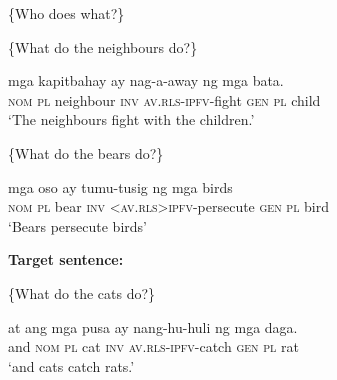 \documentclass[output=paper,
,modfonts
,nonflat]{langsci/langscibook}
\begin{document}
\newpage 
\begin{exe}
\ex\label{text5_part2a}
\begin{xlist}
 \{Who does what?\}
\end{xlist}
\begin{xlist}[{>}{>}> Q\textsubscript{{1.3}}:]
 \{What do the neighbours do?\}
\end{xlist}
\begin{xlist}[{>}>{>}> A\textsubscript{{1.3}}:]
 mga {kapitbahay{\cb}\ctopic} ay {{\ob}nag-a-away} ng mga {bata{\cb}\focus{\cb}\sq}.\\
\textsc{\void{[[}nom} \textsc{pl} neighbour \textsc{inv} \textsc{\void{[}av.rls-ipfv}-fight \textsc{gen} \textsc{pl} child\\
\glt `The neighbours fight with the children.' 
\end{xlist}
\begin{xlist}[{>}{>}> Q\textsubscript{{1.3}}:]
 \{What do the bears do?\}
\end{xlist}
\begin{xlist}[{>}>{>}> A\textsubscript{{1.3}}:]
 mga {oso{\cb}\ctopic} ay {{\ob}t{\USSmaller}um{\USGreater}u-tusig} ng mga {birds{\cb}\focus{\cb}\sq}\\
 \textsc{\void{[[}nom} \textsc{pl} bear \textsc{inv} \textsc{\void{[}<av.rls>ipfv}-persecute  \textsc{gen} \textsc{pl} bird\\
\glt `Bears persecute birds' 
\end{xlist}
\end{exe}

\begin{exe}
\ex\label{text5_part2}\textbf{Target sentence:}
\begin{xlist}
 \{What do the cats do?\}
\end{xlist}
\begin{xlist}[{>}>{>}> A\textsubscript{{1.3}}:]
\gll at {{\ob}{\ob}ang} mga {pusa{\cb}\ctopic} ay {{\ob}nang-hu-huli} ng mga {daga{\cb}\focus{\cb}}.\\
 and \textsc{\void{[[}nom} \textsc{pl} cat \textsc{inv} \textsc{\void{[}av.rls-ipfv}-catch \textsc{gen} \textsc{pl} rat\\
\glt `and cats catch rats.'
\end{xlist}
\end{exe}
\end{document}
